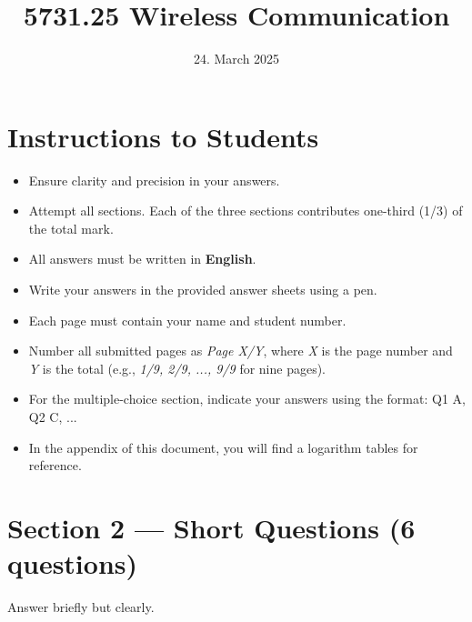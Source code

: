 \documentclass[11pt,a4paper]{article}
\begin{document}
\pagestyle{fancy}
\fancyhf{}  %
\renewcommand{\headrulewidth}{0pt}  %
\renewcommand{\footrulewidth}{0pt}  %
\fancyfoot[R]{\thepage/\pageref{LastPage}}  %
\fancypagestyle{plain}{
    \fancyhf{}  %
    \fancyfoot[R]{\thepage/\pageref{LastPage}}  %
    \renewcommand{\headrulewidth}{0pt}  %
    \renewcommand{\footrulewidth}{0pt}  %
}
\title{5731.25 Wireless Communication}
\date{24. March 2025}
\maketitle

\section*{Instructions to Students}

\begin{itemize}
    \item Ensure clarity and precision in your answers.
    \item Attempt all sections. Each of the three sections contributes one-third (1/3) of the total mark.
    \item All answers must be written in \textbf{English}.
    \item Write your answers in the provided answer sheets using a pen.
    \item Each page must contain your name and student number.
    \item Number all submitted pages as \textit{Page X/Y}, where \textit{X} is the page number and \textit{Y} is the total (e.g., \textit{1/9, 2/9, ..., 9/9} for nine pages). 
    \item For the multiple-choice section, indicate your answers using the format: Q1 A, Q2 C, ...
    \item In the appendix of this document, you will find a logarithm tables for reference.
\end{itemize}
\newpage

\newpage

\section*{Section 2 --- Short Questions (6 questions)}

Answer briefly but clearly.
\end{document}
